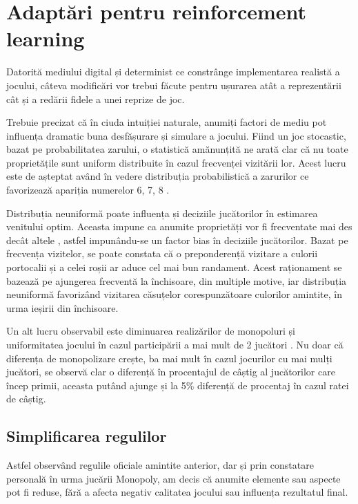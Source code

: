 \section{Adaptări pentru reinforcement learning}
Datorită mediului digital și determinist ce constrânge implementarea realistă a jocului, câteva modificări vor trebui făcute pentru ușurarea atât a reprezentării cât și a redării fidele a unei reprize de joc.

Trebuie precizat că în ciuda intuiției naturale, anumiți factori de mediu pot influența dramatic buna desfășurare și simulare a jocului. Fiind un joc stocastic, bazat pe probabilitatea zarului, o statistică amănunțită \cite{monopoly_statistics} ne arată clar că nu toate proprietățile sunt uniform distribuite în cazul frecvenței vizitării lor. Acest lucru este de așteptat având în vedere distribuția probabilistică a zarurilor ce favorizează apariția numerelor 6, 7, 8 \cite{dice_statistics}.

Distribuția neuniformă poate influența și deciziile jucătorilor în estimarea venitului optim. Aceasta impune ca anumite proprietăți vor fi frecventate mai des decât altele \cite{monopoly_statistics_positions}, astfel impunându-se un factor bias în deciziile jucătorilor. Bazat pe frecvența vizitelor, se poate constata că o preponderență vizitare a culorii portocalii și a celei roșii ar aduce cel mai bun randament. Acest raționament se bazează pe ajungerea frecventă la închisoare, din multiple motive, iar distribuția neuniformă favorizând vizitarea căsuțelor corespunzătoare culorilor amintite, în urma ieșirii din închisoare.

Un alt lucru observabil este diminuarea realizărilor de monopoluri și uniformitatea jocului în cazul participării a mai mult de 2 jucători \cite{monopoly_statistic_players}. Nu doar că diferența de monopolizare crește, ba mai mult în cazul jocurilor cu mai mulți jucători, se observă clar o diferență în procentajul de câștig al jucătorilor care încep primii, aceasta putând ajunge și la 5\% diferență de procentaj în cazul ratei de câștig.

\subsection{Simplificarea regulilor}
Astfel observând regulile oficiale amintite anterior, dar și prin constatare personală în urma jucării Monopoly, am decis că anumite elemente sau aspecte pot fi reduse, fără a afecta negativ calitatea jocului sau influența rezultatul final.

